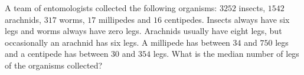 A team of entomologists collected the following organisms: $3252$ insects, $1542$ arachnids, $317$ worms, $17$ millipedes and $16$ centipedes. Insects always have six legs and worms always have zero legs. Arachnids usually have eight legs, but occasionally an arachnid has six legs. A millipede has between $34$ and $750$ legs and a centipede has between $30$ and $354$ legs. What is the median number of legs of the organisms collected?
